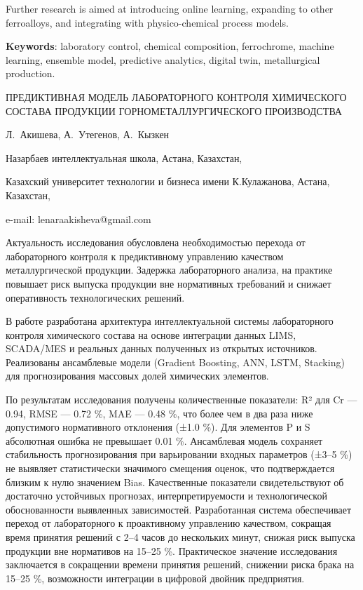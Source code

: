 Further research is aimed at introducing online learning, expanding to
other ferroalloys, and integrating with physico-chemical process models.

{\bfseries Keywords}: laboratory control, chemical composition,
ferrochrome, machine learning, ensemble model, predictive analytics,
digital twin, metallurgical production.

\begin{header}
ПРЕДИКТИВНАЯ МОДЕЛЬ ЛАБОРАТОРНОГО КОНТРОЛЯ ХИМИЧЕСКОГО СОСТАВА ПРОДУКЦИИ ГОРНОМЕТАЛЛУРГИЧЕСКОГО ПРОИЗВОДСТВА

Л.~Акишева\envelope,
А.~Утегенов,
А.~Кызкен
\end{header}

\begin{affil}
Назарбаев интеллектуальная школа, Астана, Казахстан,

Казахский университет технологии и бизнеса имени К.Кулажанова, Астана, Казахстан,

e-mail: lenaraakisheva@gmail.com
\end{affil}

Актуальность исследования обусловлена необходимостью перехода от
лабораторного контроля к предиктивному управлению качеством
металлургической продукции. Задержка лабораторного анализа, на практике
повышает риск выпуска продукции вне нормативных требований и снижает
оперативность технологических решений.

В работе разработана архитектура интеллектуальной системы лабораторного
контроля химического состава на основе интеграции данных LIMS, SCADA/MES
и реальных данных полученных из открытых источников. Реализованы
ансамблевые модели (Gradient Boosting, ANN, LSTM, Stacking) для
прогнозирования массовых долей химических элементов.

По результатам исследования получены количественные показатели: R² для
Cr --- 0.94, RMSE --- 0.72 \%, MAE --- 0.48 \%, что более чем в два раза
ниже допустимого нормативного отклонения (±1.0 \%). Для элементов P и S
абсолютная ошибка не превышает 0.01 \%. Ансамблевая модель сохраняет
стабильность прогнозирования при варьировании входных параметров (±3--5
\%) не выявляет статистически значимого смещения оценок, что
подтверждается близким к нулю значением Bias. Качественные показатели
свидетельствуют об достаточно устойчивых прогнозах, интерпретируемости и
технологической обоснованности выявленных зависимостей. Разработанная
система обеспечивает переход от лабораторного к проактивному управлению
качеством, сокращая время принятия решений с 2--4 часов до нескольких
минут, снижая риск выпуска продукции вне нормативов на 15--25 \%.
Практическое значение исследования заключается в сокращении времени
принятия решений, снижении риска брака на 15--25 \%, возможности
интеграции в цифровой двойник предприятия.


